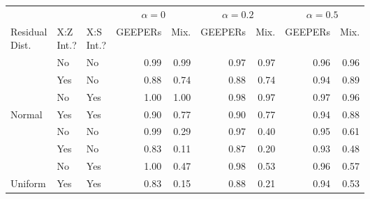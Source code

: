 \begin{tabular}[t]{lllrrrrrr}
\toprule
\multicolumn{3}{c}{ } & \multicolumn{2}{c}{$\alpha=0$} & \multicolumn{2}{c}{$\alpha=0.2$} & \multicolumn{2}{c}{$\alpha=0.5$} \\
\cmidrule(l{3pt}r{3pt}){4-5} \cmidrule(l{3pt}r{3pt}){6-7} \cmidrule(l{3pt}r{3pt}){8-9}
\makecell[l]{Residual\\Dist.} & \makecell[c]{X:Z\\Int.?} & \makecell[r]{X:S\\Int.?} & GEEPERs & Mix.  & GEEPERs & Mix. & GEEPERs & Mix.\\
\midrule
 & No & No & 0.99 & 0.99  & 0.97 & 0.97 & 0.96 & 0.96\\

 & Yes & No & 0.88 & 0.74  & 0.88 & 0.74 & 0.94 & 0.89\\

 & No & Yes & 1.00 & 1.00  & 0.98 & 0.97 & 0.97 & 0.96\\
\multirow{-4}{*}{\raggedright\arraybackslash Normal} & Yes & Yes & 0.90 & 0.77  & 0.90 & 0.77 & 0.94 & 0.88\\
\cmidrule{1-9}
 & No & No & 0.99 & 0.29  & 0.97 & 0.40 & 0.95 & 0.61\\

 & Yes & No & 0.83 & 0.11  & 0.87 & 0.20 & 0.93 & 0.48\\

 & No & Yes & 1.00 & 0.47  & 0.98 & 0.53 & 0.96 & 0.57\\

\multirow{-4}{*}{\raggedright\arraybackslash Uniform} & Yes & Yes & 0.83 & 0.15 & 0.88 & 0.21 & 0.94 & 0.53\\
\bottomrule

\end{tabular}
